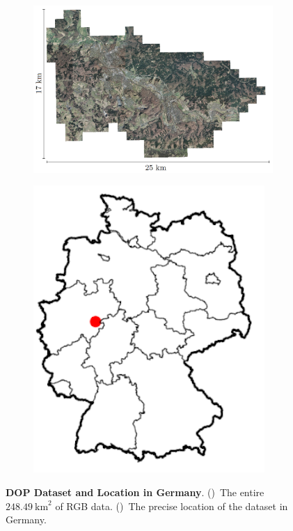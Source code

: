 \begin{figure}[h]
    \centering
    \begin{subfigure}{0.70\textwidth}
        \includegraphics[width=\textwidth]{images/dop_rgb_all}
        \caption{}
        \label{fig:dop_all}
    \end{subfigure}
    \hfill
    \begin{subfigure}{0.25\textwidth}
        \includegraphics[width=\textwidth]{images/germany_location}
        \caption{}
        \label{fig:dop_location}
    \end{subfigure}
    \caption[DOP Dataset and Location in Germany]
    {\textbf{DOP Dataset and Location in Germany}. ()~The entire $248.49~\text{km}^2$ of RGB data. ()~The precise location of the dataset in Germany.}
    \label{fig:all_rgb_location}
\end{figure}

